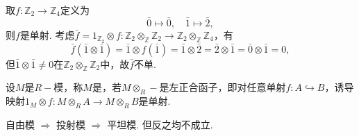 \begin{instance}
    取$f: \mathbb{Z}_2 \to \mathbb{Z}_4$定义为
    \begin{equation*}
        \bar{0} \mapsto \bar{0},\quad \bar{1} \mapsto \bar{2},
    \end{equation*}
    则$f$是单射. 考虑$\bar{f} = 1_{\mathbb{Z}_2} \otimes f: \mathbb{Z}_2 \otimes_{\mathbb{Z}} \mathbb{Z}_2 \to \mathbb{Z}_2 \otimes_{\mathbb{Z}} \mathbb{Z}_4$，有
    \begin{equation*}
        \bar{f}(\bar{1} \otimes \bar{1}) = \bar{1} \otimes f(\bar{1}) = \bar{1} \otimes \bar{2} = \bar{2} \otimes \bar{1} = \bar{0} \otimes \bar{1} = 0,
    \end{equation*}
    但$\bar{1} \otimes \bar{1} \neq 0$在$\mathbb{Z}_2 \otimes_{\mathbb{Z}} \mathbb{Z}_2$中，故$\bar{f}$不单.
\end{instance}

\begin{definition}[平坦模]
    设$M$是$R-\!\!$模，称$M$是，若$M \otimes_R -$是左正合函子，即对任意单射$f: A \hookrightarrow B$，诱导映射$1_M \otimes f: M \otimes_R A \to M \otimes_R B$是单射.
\end{definition}

\begin{remark}
    自由模 $\Rightarrow$ 投射模 $\Rightarrow$ 平坦模. 但反之均不成立.
\end{remark}